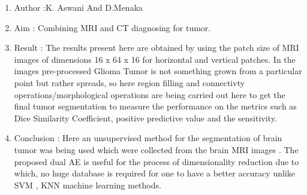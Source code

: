\documentclass[oneside,a4paper,12pt]{book}
\begin{document}
\begin{enumerate}

\item Author :K. Aswani And D.Menaka

\item Aim : Combining MRI and CT diagnosing for tumor.
\item Result : The results present here are obtained by using the patch size of MRI images of dimensions 16 x 64 x 16 for horizontal and vertical patches. In the images pre-processed Glioma Tumor is not something grown from a particular point but rather spreads, so here region filling and connectivty operations/morphological operations are being carried out here to get the final tumor segmentation to measure the performance on the metrics such as Dice Similarity Coefficient, positive predictive value and the sensitivity.
\item Conclusion :  
Here an unsupervised method for the segmentation of brain tumor was being used which were collected from the brain MRI images . The proposed dual AE is useful for the process of dimensionality reduction due to which, no huge database is required for one to have a better accuracy unlike SVM , KNN machine learning methods.
\end{enumerate}

\setlength{\parskip}{9.96pt}

\vspace{\baselineskip}

\vspace{\baselineskip}

\vspace{\baselineskip}

\vspace{\baselineskip}

\vspace{\baselineskip}

\vspace{\baselineskip}

\vspace{\baselineskip}

\vspace{\baselineskip}

\vspace{\baselineskip}

\vspace{\baselineskip}

\vspace{\baselineskip}

\vspace{\baselineskip}
\end{document}
